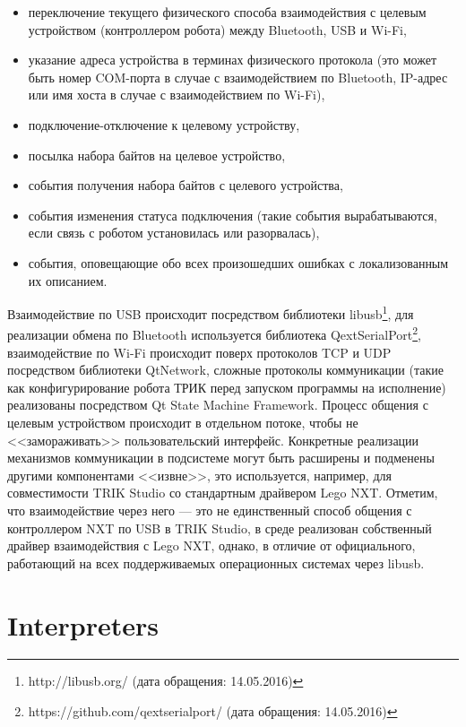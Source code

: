 \documentclass[conference]{IEEEtran}
\begin{document}
\begin{itemize}
    \item переключение текущего физического способа взаимодействия с целевым устройством (контроллером робота) между Bluetooth, USB и Wi-Fi,
    \item указание адреса устройства в терминах физического протокола (это может быть номер COM-порта в случае с взаимодействием по Bluetooth, IP-адрес или имя хоста в случае с взаимодействием по Wi-Fi),
    \item подключение-отключение к целевому устройству,
    \item посылка набора байтов на целевое устройство,
    \item события получения набора байтов с целевого устройства,
    \item события изменения статуса подключения (такие события вырабатываются, если связь с роботом установилась или разорвалась),
    \item события, оповещающие обо всех произошедших ошибках с локализованным их описанием.
\end{itemize}

Взаимодействие по USB происходит посредством библиотеки libusb\footnote{http://libusb.org/ (дата обращения: 14.05.2016)}, для реализации обмена по Bluetooth используется библиотека QextSerialPort\footnote{https://github.com/qextserialport/ (дата обращения: 14.05.2016)}, взаимодействие по Wi-Fi происходит поверх протоколов TCP и UDP посредством библиотеки QtNetwork, сложные протоколы коммуникации (такие как конфигурирование робота ТРИК перед запуском программы на исполнение) реализованы посредством Qt State Machine Framework. Процесс общения с целевым устройством происходит в отдельном потоке, чтобы не <<замораживать>> пользовательский интерфейс. Конкретные реализации механизмов коммуникации в подсистеме могут быть расширены и подменены другими компонентами <<извне>>, это используется, например, для совместимости TRIK Studio со стандартным драйвером Lego NXT. Отметим, что взаимодействие через него --- это не единственный способ общения с контроллером NXT по USB в TRIK Studio, в среде реализован собственный драйвер взаимодействия с Lego NXT, однако, в отличие от официального, работающий на всех поддерживаемых операционных системах через libusb.

\section{Interpreters}
\label{chapter:interpreters}
\end{document}
